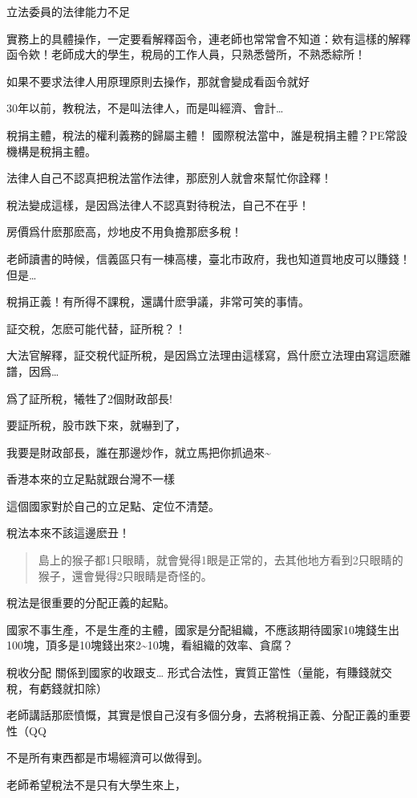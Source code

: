 \documentclass[]{ctexbook}
\begin{document}
立法委員的法律能力不足

實務上的具體操作，一定要看解釋函令，連老師也常常會不知道：欸有這樣的解釋函令欸！老師成大的學生，稅局的工作人員，只熟悉營所，不熟悉綜所！

如果不要求法律人用原理原則去操作，那就會變成看函令就好

30年以前，教稅法，不是叫法律人，而是叫經濟、會計\ldots{}

稅捐主體，稅法的權利義務的歸屬主體！
國際稅法當中，誰是稅捐主體？PE常設機構是稅捐主體。

法律人自己不認真把稅法當作法律，那麽別人就會來幫忙你詮釋！

稅法變成這樣，是因爲法律人不認真對待稅法，自己不在乎！

房價爲什麽那麽高，炒地皮不用負擔那麽多稅！

老師讀書的時候，信義區只有一棟高樓，臺北市政府，我也知道買地皮可以賺錢！但是\ldots{}

稅捐正義！有所得不課稅，還講什麽爭議，非常可笑的事情。

証交稅，怎麽可能代替，証所稅？！

大法官解釋，証交稅代証所稅，是因爲立法理由這樣寫，爲什麽立法理由寫這麽離譜，因爲\ldots{}

爲了証所稅，犧牲了2個財政部長!

要証所稅，股市跌下來，就嚇到了，

我要是財政部長，誰在那邊炒作，就立馬把你抓過來\textasciitilde{}

香港本來的立足點就跟台灣不一樣

這個國家對於自己的立足點、定位不清楚。

稅法本來不該這邊麽丑！

\begin{quote}
島上的猴子都1只眼睛，就會覺得1眼是正常的，去其他地方看到2只眼睛的猴子，還會覺得2只眼睛是奇怪的。
\end{quote}

稅法是很重要的分配正義的起點。

國家不事生產，不是生產的主體，國家是分配組織，不應該期待國家10塊錢生出100塊，頂多是10塊錢出來2\textasciitilde10塊，看組織的效率、貪腐？

稅收分配 關係到國家的收跟支\ldots{}
形式合法性，實質正當性（量能，有賺錢就交稅，有虧錢就扣除）

老師講話那麽憤慨，其實是恨自己沒有多個分身，去將稅捐正義、分配正義的重要性（QQ

不是所有東西都是市場經濟可以做得到。

老師希望稅法不是只有大學生來上，
\end{document}
